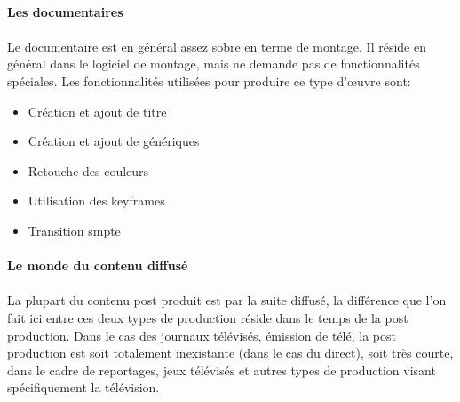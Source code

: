 \paragraph {Les documentaires}

\paragraph{}

Le documentaire est en général assez sobre en terme de montage. Il
réside en général dans le logiciel de montage, mais ne demande pas
de fonctionnalités spéciales. Les fonctionnalités utilisées pour
produire ce type d'œuvre sont:

\begin{itemize} \setlength{\itemsep}{2mm}

  \item{Création et ajout de titre}

  \item{Création et ajout de génériques}

  \item{Retouche des couleurs}

  \item{Utilisation des keyframes}

  \item{Transition smpte }

\end{itemize}

\paragraph{Le monde du contenu diffusé}

\paragraph{}


La plupart du contenu post produit est par la suite diffusé, la
différence que l'on fait ici entre ces deux types de production
réside dans le temps de la post production.  Dans le cas des journaux
télévisés, émission de télé, la post production est soit totalement
inexistante (dans le cas du direct), soit très courte, dans le cadre
de reportages, jeux télévisés et autres types de production visant
spécifiquement la télévision.

